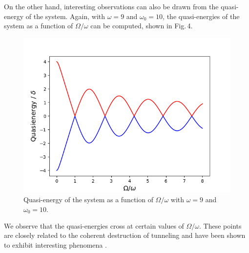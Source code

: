 \documentclass[reprint, amsmath, amssymb, aps]{revtex4-2}
\begin{document}
On the other hand, interesting observations can also be drawn from the quasi-energy of the system. Again, with $\omega = 9$ and $\omega_0= 10$, the quasi-energies of the system as a function of $\Omega/ \omega$ can be computed, shown in Fig.\,4. 
\begin{figure}
\includegraphics[scale=0.45]{F3}
\caption{Quasi-energy of the system as a function of $\Omega/\omega $ with $\omega = 9$ and $\omega_0= 10$. }
\end{figure}
We observe that the quasi-energies cross at certain values of $\Omega/ \omega$. These points are closely related to the coherent destruction of tunneling and have been shown to exhibit interesting phenomena \cite{QuTiP, Grossmann, Miao, Kayanuma}. \\
\end{document}
